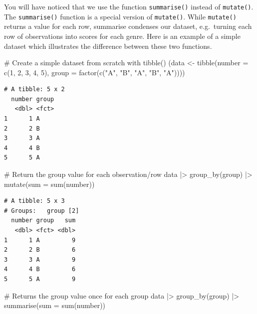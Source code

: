 \documentclass[
  letterpaper,
  DIV=11,
  numbers=noendperiod]{scrreprt}
\newenvironment{Shaded}{\begin{snugshade}}{\end{snugshade}}
\newcommand{\AttributeTok}[1]{\textcolor[rgb]{0.40,0.45,0.13}{#1}}
\newcommand{\CommentTok}[1]{\textcolor[rgb]{0.37,0.37,0.37}{#1}}
\newcommand{\DecValTok}[1]{\textcolor[rgb]{0.68,0.00,0.00}{#1}}
\newcommand{\FunctionTok}[1]{\textcolor[rgb]{0.28,0.35,0.67}{#1}}
\newcommand{\NormalTok}[1]{\textcolor[rgb]{0.00,0.23,0.31}{#1}}
\newcommand{\OtherTok}[1]{\textcolor[rgb]{0.00,0.23,0.31}{#1}}
\newcommand{\SpecialCharTok}[1]{\textcolor[rgb]{0.37,0.37,0.37}{#1}}
\newcommand{\StringTok}[1]{\textcolor[rgb]{0.13,0.47,0.30}{#1}}
\begin{document}
You will have noticed that we use the function \texttt{summarise()}
instead of \texttt{mutate()}. The \texttt{summarise()} function is a
special version of \texttt{mutate()}. While \texttt{mutate()} returns a
value for each row, summarise condenses our dataset, e.g.~turning each
row of observations into scores for each genre. Here is an example of a
simple dataset which illustrates the difference between these two
functions.

\begin{Shaded}
\begin{Highlighting}[]
\CommentTok{\# Create a simple dataset from scratch with tibble()}
\NormalTok{(data }\OtherTok{\textless{}{-}} \FunctionTok{tibble}\NormalTok{(}\AttributeTok{number =} \FunctionTok{c}\NormalTok{(}\DecValTok{1}\NormalTok{, }\DecValTok{2}\NormalTok{, }\DecValTok{3}\NormalTok{, }\DecValTok{4}\NormalTok{, }\DecValTok{5}\NormalTok{),}
               \AttributeTok{group =} \FunctionTok{factor}\NormalTok{(}\FunctionTok{c}\NormalTok{(}\StringTok{"A"}\NormalTok{, }\StringTok{"B"}\NormalTok{, }\StringTok{"A"}\NormalTok{, }\StringTok{"B"}\NormalTok{, }\StringTok{"A"}\NormalTok{))))}
\end{Highlighting}
\end{Shaded}

\begin{verbatim}
# A tibble: 5 x 2
  number group
   <dbl> <fct>
1      1 A    
2      2 B    
3      3 A    
4      4 B    
5      5 A    
\end{verbatim}

\begin{Shaded}
\begin{Highlighting}[]
\CommentTok{\# Return the group value for each observation/row}
\NormalTok{data }\SpecialCharTok{|\textgreater{}}
  \FunctionTok{group\_by}\NormalTok{(group) }\SpecialCharTok{|\textgreater{}}
  \FunctionTok{mutate}\NormalTok{(}\AttributeTok{sum =} \FunctionTok{sum}\NormalTok{(number))}
\end{Highlighting}
\end{Shaded}

\begin{verbatim}
# A tibble: 5 x 3
# Groups:   group [2]
  number group   sum
   <dbl> <fct> <dbl>
1      1 A         9
2      2 B         6
3      3 A         9
4      4 B         6
5      5 A         9
\end{verbatim}

\begin{Shaded}
\begin{Highlighting}[]
\CommentTok{\# Returns the group value once for each group}
\NormalTok{data }\SpecialCharTok{|\textgreater{}}
  \FunctionTok{group\_by}\NormalTok{(group) }\SpecialCharTok{|\textgreater{}}
  \FunctionTok{summarise}\NormalTok{(}\AttributeTok{sum =} \FunctionTok{sum}\NormalTok{(number))}
\end{Highlighting}
\end{Shaded}
\end{document}

